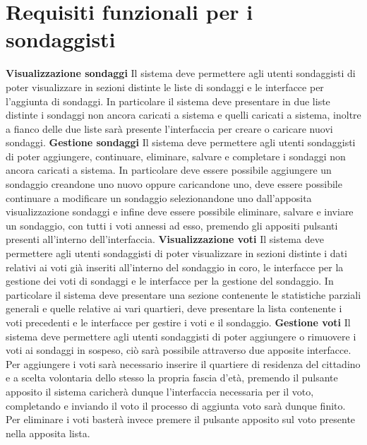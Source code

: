     \section{Requisiti funzionali per i sondaggisti}
        \begin{rfList}
            \rfItem \textbf{Visualizzazione sondaggi} Il sistema deve permettere agli utenti sondaggisti di poter visualizzare in sezioni distinte le liste di sondaggi e le interfacce per l'aggiunta di sondaggi. In particolare il sistema deve presentare in due liste distinte i sondaggi non ancora caricati a sistema e quelli caricati a sistema, inoltre a fianco delle due liste sarà presente l'interfaccia per creare o caricare nuovi sondaggi.
            \rfItem \textbf{Gestione sondaggi} Il sistema deve permettere agli utenti sondaggisti di poter aggiungere, continuare, eliminare, salvare e completare i sondaggi non ancora caricati a sistema. In particolare deve essere possibile aggiungere un sondaggio creandone uno nuovo oppure caricandone uno, deve essere possibile continuare a modificare un sondaggio selezionandone uno dall'apposita visualizzazione sondaggi e infine deve essere possibile eliminare, salvare e inviare un sondaggio, con tutti i voti annessi ad esso, premendo gli appositi pulsanti presenti all'interno dell'interfaccia.
            \rfItem \textbf{Visualizzazione voti} Il sistema deve permettere agli utenti sondaggisti di poter visualizzare in sezioni distinte i dati relativi ai voti già inseriti all'interno del sondaggio in coro, le interfacce per la gestione dei voti di sondaggi e le interfacce per la gestione del sondaggio. In particolare il sistema deve presentare una sezione contenente le statistiche parziali generali e quelle relative ai vari quartieri, deve presentare la lista contenente i voti precedenti e le interfacce per gestire i voti e il sondaggio.
            \rfItem \textbf{Gestione voti} Il sistema deve permettere agli utenti sondaggisti di poter aggiungere o rimuovere i voti ai sondaggi in sospeso, ciò sarà possibile attraverso due apposite interfacce. Per aggiungere i voti sarà necessario inserire il quartiere di residenza del cittadino e a scelta volontaria dello stesso la propria fascia d'età, premendo il pulsante apposito il sistema caricherà dunque l'interfaccia necessaria per il voto, completando e inviando il voto il processo di aggiunta voto sarà dunque finito. Per eliminare i voti basterà invece premere il pulsante apposito sul voto presente nella apposita lista.
        \end{rfList}
